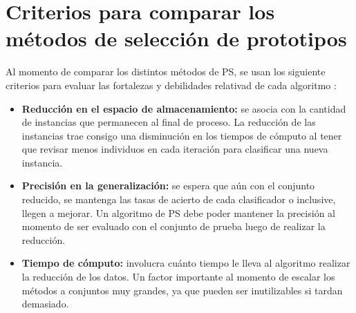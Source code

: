 \section{Criterios para comparar los métodos de selección de prototipos}

Al momento de comparar los distintos métodos de PS, se usan los siguiente criterios para evaluar las fortalezas y debilidades relativad de cada algoritmo \cite{garcia2016data}:

\begin{itemize}
\item \textbf{Reducción en el espacio de almacenamiento:}
se asocia con la cantidad de instancias que permanecen al final de proceso. La reducción de las instancias trae consigo una disminución en los tiempos de cómputo al tener que revisar menos individuos en cada iteración para clasificar una nueva instancia.

\item \textbf{Precisión en la generalización:}
se espera que aún con el conjunto reducido, se mantenga las tasas de acierto de cada clasificador o inclusive, llegen a mejorar. Un algoritmo de PS debe poder mantener la precisión al momento de ser evaluado con el conjunto de prueba luego de realizar la reducción.

\item \textbf{Tiempo de cómputo:}
involucra cuánto tiempo le lleva al algoritmo realizar la reducción de los datos. Un factor importante al momento de escalar los métodos a conjuntos muy grandes, ya que pueden ser inutilizables si tardan demasiado.
\end{itemize}